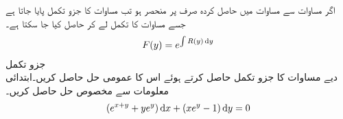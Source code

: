 اگر مساوات  سے مساوات  میں حاصل کردہ   صرف  پر منحصر ہو تب  مساوات  کا جزو تکمل پایا جاتا ہے جسے مساوات  کا تکمل لے کر حاصل کیا جا سکتا ہے۔
\begin{align}\label{مساوات_سادہ_اول_جزو_تکمل__مساوات_ب}
F(y)=e^{\int R(y) \dif y}
\end{align}
%
\quad جزو تکمل\\
دیے مساوات کا جزو تکمل حاصل کرتے ہوئے اس کا عمومی حل حاصل کریں۔ابتدائی معلومات  سے مخصوص حل حاصل کریں۔
\begin{align}\label{مساوات_سادہ_اول_مثال_جزو_تکمل}
(e^{x+y}+ye^y)\dif x+(xe^y-1)\dif y=0
\end{align}

